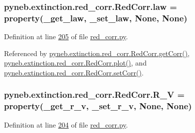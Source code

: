 \begin{DoxyVerb}
\hypertarget{classpyneb_1_1extinction_1_1red__corr_1_1_red_corr_adfed423013315bad4ba5dda2368dc3d0}{}
\subsubsection[{law}]{\setlength{\rightskip}{0pt plus 5cm}pyneb.\+extinction.\+red\+\_\+corr.\+Red\+Corr.\+law = property({\bf \+\_\+get\+\_\+law}, {\bf \+\_\+set\+\_\+law}, None, None)\hspace{0.3cm}{\ttfamily [static]}}\label{classpyneb_1_1extinction_1_1red__corr_1_1_red_corr_adfed423013315bad4ba5dda2368dc3d0}


Definition at line \hyperlink{red__corr_8py_source_l00205}{205} of file \hyperlink{red__corr_8py_source}{red\+\_\+corr.\+py}.



Referenced by \hyperlink{red__corr_8py_source_l00211}{pyneb.\+extinction.\+red\+\_\+corr.\+Red\+Corr.\+get\+Corr()}, \hyperlink{red__corr_8py_source_l00303}{pyneb.\+extinction.\+red\+\_\+corr.\+Red\+Corr.\+plot()}, and \hyperlink{red__corr_8py_source_l00281}{pyneb.\+extinction.\+red\+\_\+corr.\+Red\+Corr.\+set\+Corr()}.

\hypertarget{classpyneb_1_1extinction_1_1red__corr_1_1_red_corr_a4696ecdd84c912c20e6aa19b1573e875}{}
\subsubsection[{R\+\_\+\+V}]{\setlength{\rightskip}{0pt plus 5cm}pyneb.\+extinction.\+red\+\_\+corr.\+Red\+Corr.\+R\+\_\+\+V = property({\bf \+\_\+get\+\_\+r\+\_\+v}, {\bf \+\_\+set\+\_\+r\+\_\+v}, None, None)\hspace{0.3cm}{\ttfamily [static]}}\label{classpyneb_1_1extinction_1_1red__corr_1_1_red_corr_a4696ecdd84c912c20e6aa19b1573e875}


Definition at line \hyperlink{red__corr_8py_source_l00204}{204} of file \hyperlink{red__corr_8py_source}{red\+\_\+corr.\+py}.




\end{DoxyVerb}
